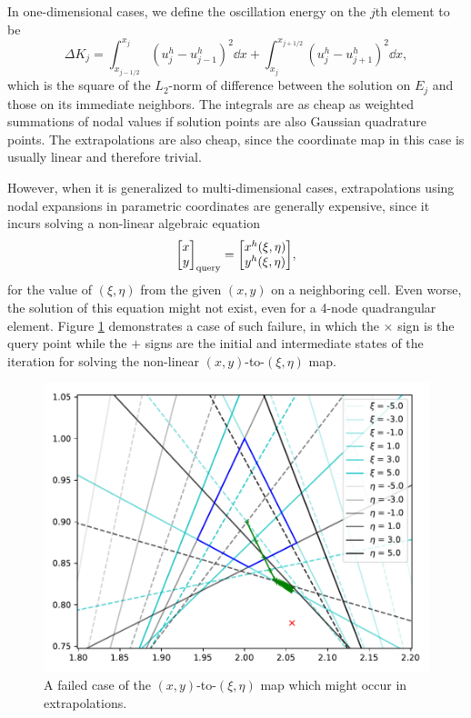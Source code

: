 \documentclass[10pt]{article}
\begin{document}
%
In one-dimensional cases, we define the oscillation energy on the $j$th element to be
$$
\Delta K_j = \int_{x_{j-1/2}}^{x_{j}}\left(u_{j}^{h}-u_{j-1}^{h}\right)^{2}\dd{x}+\int_{x_{j}}^{x_{j+1/2}}\left(u_{j}^{h}-u_{j+1}^{h}\right)^{2}\dd{x},
$$
which is the square of the $L_2$-norm of difference between the solution on $E_j$ and those on its immediate neighbors.
%
The integrals are as cheap as weighted summations of nodal values if solution points are also Gaussian quadrature points.
%
The extrapolations are also cheap, since the coordinate map in this case is usually linear and therefore trivial.

%
However, when it is generalized to multi-dimensional cases, extrapolations using nodal expansions in parametric coordinates are generally expensive, since it incurs solving a non-linear algebraic equation
$$
\mqty[x \\ y]_\text{query} = \mqty[x^h(\xi, \eta) \\ y^h(\xi, \eta)],
$$
for the value of $(\xi,\eta)$ from the given $(x,y)$ on a neighboring cell.
%
Even worse, the solution of this equation might not exist, even for a 4-node quadrangular element.
%
Figure \ref{coordmap} demonstrates a case of such failure, in which the $\times$ sign is the query point while the $+$ signs are the initial and intermediate states of the iteration for solving the non-linear $(x,y)$-to-$(\xi,\eta)$ map.
%
\begin{figure}[H]
  \centering
  \includegraphics[width=.9\textwidth]{./coordmap.pdf}
  \caption{A failed case of the $(x,y)$-to-$(\xi,\eta)$ map which might occur in extrapolations.}
  \label{coordmap}
\end{figure}
%
\end{document}
